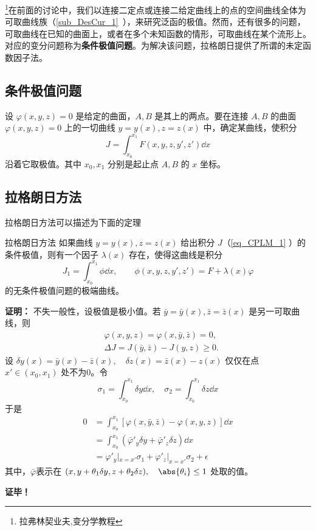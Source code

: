 
\footnote{拉弗林契业夫,变分学教程}在前面的讨论中，我们以连接二定点或连接二给定曲线上的点的空间曲线全体为可取曲线族（\autoref{sub_DesCur_1}~），来研究泛函的极值。然而，还有很多的问题，可取曲线在已知的曲面上，或者在多个未知函数的情形，可取曲线在某个流形上。对应的变分问题称为\textbf{条件极值问题}。为解决该问题，拉格朗日提供了所谓的未定函数因子法。
\subsection{条件极值问题}
设 $\varphi(x,y,z)=0$ 是给定的曲面，$A,B$ 是其上的两点。要在连接 $A,B$ 的曲面$\varphi(x,y,z)=0$ 上的一切曲线 $y=y(x),z=z(x)$ 中，确定某曲线，使积分
\begin{equation}\label{eq_CPLM_1}
J=\int_{x_0}^{x_1}F(x,y,z,y',z')\dd x
\end{equation}
沿着它取极值。其中 $x_0,x_1$ 分别是起止点 $A,B$ 的 $x$ 坐标。
\subsection{拉格朗日方法}
拉格朗日方法可以描述为下面的定理
\begin{theorem}{拉格朗日方法}
如果曲线 $y=y(x),z=z(x)$ 给出积分 $J$（\autoref{eq_CPLM_1} ）的条件极值，则有一个因子 $\lambda(x)$ 存在，使得这曲线是积分
\begin{equation}
J_1=\int_{x_0}^{x_1}\phi \dd x,\qquad \phi(x,y,z,y',z')=F+\lambda(x)\varphi
\end{equation}
的无条件极值问题的极端曲线。
\end{theorem}
\textbf{证明：}
不失一般性，设极值是极小值。若 $\bar y=\bar y(x),\bar z=\bar z(x)$ 是另一可取曲线，则
\begin{equation}
\begin{aligned}
&\varphi(x,y,z)=\varphi(x,\bar y,\bar z)=0,\\
&\Delta J=J(\bar y,\bar z)-J(y,z)\geq0.
\end{aligned}
\end{equation}
设 $\delta y(x)=\bar y(x)-\bar z(x),\quad\delta z(x)=\bar z(x)-z(x)$ 仅仅在点 $x'\in (x_0,x_1)$ 处不为0。令
\begin{equation}
\sigma_1=\int_{x_0}^{x_1}\delta y\dd x,\quad \sigma_2=\int_{x_0}^{x_1}\delta z\dd x
\end{equation}
于是
\begin{equation}
\begin{aligned}
0&=\int_{x_0}^{x_1}[\varphi(x,\bar y,\bar z)-\varphi(x,y,z)]\dd x\\
&=\int_{x_0}^{x_1}(\bar\varphi'_y\delta y+\bar\varphi'_z\delta z)\dd x\\
&=\varphi'_y|_{x=x'}\sigma_1+\varphi'_z|_{x=x'}\sigma_2+\epsilon
\end{aligned}
\end{equation}
其中，$\bar\varphi$表示在 $(x,y+\theta_1\delta y,z+\theta_2\delta z),\quad \abs{\theta_i}\leq 1$ 处取的值。

\textbf{证毕！}
